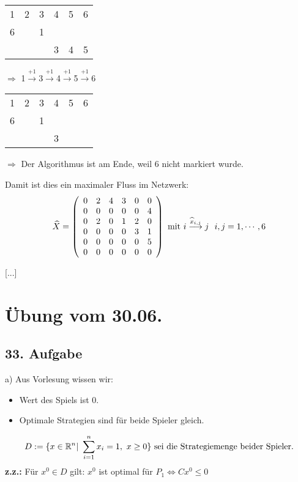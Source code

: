 \documentclass[a4paper,11pt,twoside,titlepage]{article}
\newcommand{\R}{{\mathbb R}}
\begin{document}
\begin{tabular}{cccccc}
1&2&3&4&5&6\\\cline{1-6}
6& &1 & & & \\
 & & & 3&4 &5 \\
\end{tabular}
$\Longrightarrow$ 1$\stackrel{+1}{\longrightarrow}$3$\stackrel{+1}{\longrightarrow}$4$\stackrel{+1}{\longrightarrow}$5$\stackrel{+1}{\longrightarrow}$6

\begin{tabular}{cccccc}
1&2&3&4&5&6\\\cline{1-6}
6& &1 & & & \\
 & & & 3& & \\
\end{tabular}
$\Rightarrow$ Der Algorithmus ist am Ende, weil 6 nicht markiert wurde. 

Damit ist dies ein maximaler Fluss im Netzwerk:
\[\widehat{X}=\left(\begin{array}{cccccc}0&2&4&3&0&0\\0&0&0&0&0&4\\0&2&0&1&2&0\\0&0&0&0&3&1\\0&0&0&0&0&5\\0&0&0&0&0&0\end{array}\right) \textnormal{ mit }i\stackrel{\widehat{x}_{i,j}}{\longrightarrow}j\ \ i,j=1,\cdots,6\]
	
[...]

\newpage
\section{Übung vom 30.06.}

\subsection*{33. Aufgabe}
a) Aus Vorlesung wissen wir:
\begin{itemize}
\item Wert des Spiels ist 0.
\item Optimale Strategien sind für beide Spieler gleich.
\end{itemize}
\[ D:=\{x\in\R^n|\ \sum_{i=1}^nx_i=1,\ x\ge0\} \textnormal{ sei die Strategiemenge beider Spieler.} \]
\textbf{z.z.:} Für $x^0\in D$ gilt: $x^0$ ist optimal für $P_1\Leftrightarrow Cx^0\le0$\\
\end{document}
